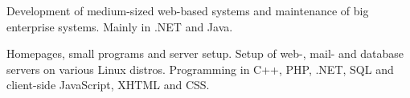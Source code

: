 \documentclass[10pt,a4paper]{altacv}
\begin{document}
Development of medium-sized web-based systems and maintenance of big enterprise systems. Mainly in .NET and Java.

\divider

Homepages, small programs and server setup. Setup of web-, mail- and database servers on various Linux distros. Programming in C++, PHP, .NET, SQL and client-side JavaScript, XHTML and CSS.

\divider


\divider


\clearpage

\end{document}
